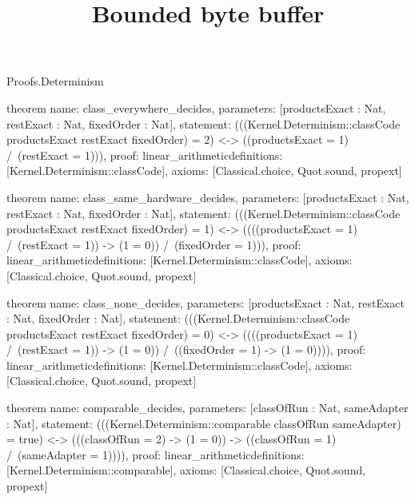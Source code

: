 \begin{lexlean}{Proofs.Determinism}
\title{Bounded byte buffer}
\begin{semanticmodule}
theorem{
  name: class_everywhere_decides,
  parameters: [productsExact : Nat, restExact : Nat, fixedOrder : Nat],
  statement: (((Kernel.Determinism::classCode productsExact restExact fixedOrder) = 2) <-> ((productsExact = 1) /\ (restExact = 1))),
  proof: linear_arithmetic{definitions: [Kernel.Determinism::classCode]},
  axioms: [Classical.choice, Quot.sound, propext]
}

theorem{
  name: class_same_hardware_decides,
  parameters: [productsExact : Nat, restExact : Nat, fixedOrder : Nat],
  statement: (((Kernel.Determinism::classCode productsExact restExact fixedOrder) = 1) <-> ((((productsExact = 1) /\ (restExact = 1)) -> (1 = 0)) /\ (fixedOrder = 1))),
  proof: linear_arithmetic{definitions: [Kernel.Determinism::classCode]},
  axioms: [Classical.choice, Quot.sound, propext]
}

theorem{
  name: class_none_decides,
  parameters: [productsExact : Nat, restExact : Nat, fixedOrder : Nat],
  statement: (((Kernel.Determinism::classCode productsExact restExact fixedOrder) = 0) <-> ((((productsExact = 1) /\ (restExact = 1)) -> (1 = 0)) /\ ((fixedOrder = 1) -> (1 = 0)))),
  proof: linear_arithmetic{definitions: [Kernel.Determinism::classCode]},
  axioms: [Classical.choice, Quot.sound, propext]
}

theorem{
  name: comparable_decides,
  parameters: [classOfRun : Nat, sameAdapter : Nat],
  statement: (((Kernel.Determinism::comparable classOfRun sameAdapter) = true) <-> (((classOfRun = 2) -> (1 = 0)) -> ((classOfRun = 1) /\ (sameAdapter = 1)))),
  proof: linear_arithmetic{definitions: [Kernel.Determinism::comparable]},
  axioms: [Classical.choice, Quot.sound, propext]
}
\end{semanticmodule}
\end{lexlean}
